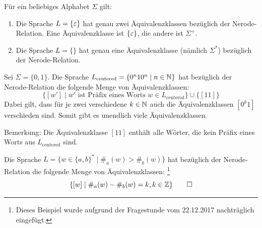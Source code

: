 \begin{Bsp}
      Für ein beliebiges Alphabet $\Sigma$ gilt:
      \begin{enumerate}
       \item Die Sprache $L=\{\varepsilon\}$ hat genau zwei Äquivalenzklassen bezüglich der Nerode-Relation.
      Eine Äquivalenzklasse ist $\{\varepsilon\}$, die andere ist $\Sigma^+$.
       \item Die Sprache $L=\{\}$ hat genau eine Äquivalenzklasse (nämlich $\Sigma^*$) bezüglich der Nerode-Relation.
       \qedhere
      \end{enumerate}
\end{Bsp}

\begin{Bsp}\label{bsp:2.centeredMyhillNerode}
Sei $\Sigma=\{0,1\}$. Die Sprache $L_\text{centered}=\{0^n10^n \mid n\in\mathbb{N}\}$ hat bezüglich der Nerode-Relation die folgende Menge von Äquivalenzklassen:
$$\{ [w'] \mid w' \text{ ist Präfix eines Worts } w\in L_\text{centered}\} \cup \{ [11] \}$$
Dabei gilt, dass für je zwei verschiedene $k\in\mathbb{N}$
auch die Äquivalenzklassen $[0^k1]$ verschieden sind. Somit gibt es unendlich viele Äquivalenzklassen.

Bemerkung: Die Äquivalenzklasse $[11]$ enthält alle Wörter, die kein Präfix eines Worts aus $L_\text{centered}$ sind.
\end{Bsp}

{\color{violet}
\begin{Bsp*}
 Die Sprache $L=\{w \in \{a,b\}^* \mid \#_a(w) > \#_b(w)\}$ hat bezüglich der Nerode-Relation die folgende Menge von Äquivalenzklassen:%
 \footnote{Dieses Beispiel wurde aufgrund der Fragestunde vom 22.12.2017 nachträglich eingefügt.}
 \[
 \{ [w] \mid  \#_a(w) - \#_b(w)=k, k\in\mathbb{Z} \}
 \qedhere
 \]
\end{Bsp*}
}



